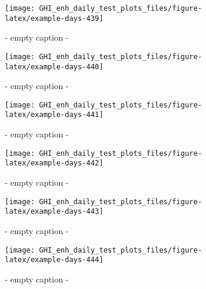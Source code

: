 \documentclass[
  10pt,
  a4paper,oneside]{article}
\begin{document}
\begin{figure}[H]

{\centering \texttt{[image: GHI\_enh\_daily\_test\_plots\_files/figure-latex/example-days-439]} 

}

\caption{ - empty caption - }\label{fig:example-days-439}
\end{figure}

\begin{figure}[H]

{\centering \texttt{[image: GHI\_enh\_daily\_test\_plots\_files/figure-latex/example-days-440]} 

}

\caption{ - empty caption - }\label{fig:example-days-440}
\end{figure}

\begin{figure}[H]

{\centering \texttt{[image: GHI\_enh\_daily\_test\_plots\_files/figure-latex/example-days-441]} 

}

\caption{ - empty caption - }\label{fig:example-days-441}
\end{figure}

\begin{figure}[H]

{\centering \texttt{[image: GHI\_enh\_daily\_test\_plots\_files/figure-latex/example-days-442]} 

}

\caption{ - empty caption - }\label{fig:example-days-442}
\end{figure}

\begin{figure}[H]

{\centering \texttt{[image: GHI\_enh\_daily\_test\_plots\_files/figure-latex/example-days-443]} 

}

\caption{ - empty caption - }\label{fig:example-days-443}
\end{figure}

\begin{figure}[H]

{\centering \texttt{[image: GHI\_enh\_daily\_test\_plots\_files/figure-latex/example-days-444]} 

}

\caption{ - empty caption - }\label{fig:example-days-444}
\end{figure}
\end{document}
